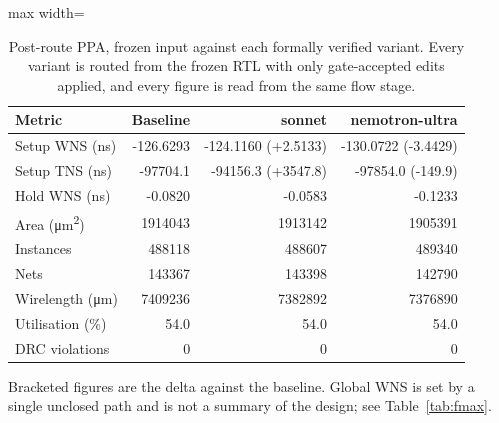 \begin{table}[htbp]
  \centering
  \footnotesize
  \caption{Post-route PPA, frozen input against each formally verified variant. Every variant is routed from the frozen RTL with only gate-accepted edits applied, and every figure is read from the same flow stage.}
  \label{tab:ppa}
  \begin{adjustbox}{max width=\textwidth}
  \begin{tabular}{lrrr}
    \toprule
    \textbf{Metric} & \textbf{Baseline} & \textbf{sonnet} & \textbf{nemotron-ultra} \\
    \midrule
    Setup WNS (ns) & -126.6293 & -124.1160 \tiny(+2.5133) & -130.0722 \tiny(-3.4429) \\
    Setup TNS (ns) & -97704.1 & -94156.3 \tiny(+3547.8) & -97854.0 \tiny(-149.9) \\
    Hold WNS (ns) & -0.0820 & -0.0583 & -0.1233 \\
    Area (\si{\um\squared}) & 1914043 & 1913142 & 1905391 \\
    Instances & 488118 & 488607 & 489340 \\
    Nets & 143367 & 143398 & 142790 \\
    Wirelength (\si{\um}) & 7409236 & 7382892 & 7376890 \\
    Utilisation (\%) & 54.0 & 54.0 & 54.0 \\
    DRC violations & 0 & 0 & 0 \\
    \bottomrule
  \end{tabular}
  \end{adjustbox}
  \par\smallskip\footnotesize\raggedright Bracketed figures are the delta against the baseline. Global WNS is set by a single unclosed path and is not a summary of the design; see Table~\ref{tab:fmax}.
\end{table}
